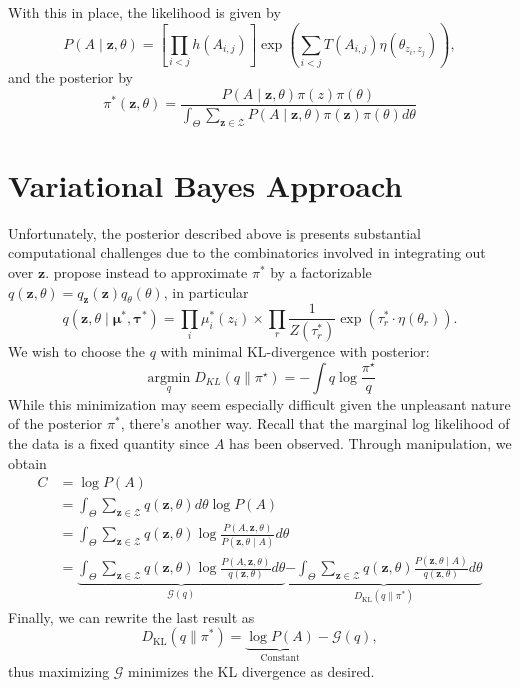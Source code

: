 \documentclass[11pt]{article}   %
\newcommand{\V}[1]{\ensuremath{\boldsymbol{#1}}}
\newcommand{\M}[1]{\ensuremath{#1}}
\begin{document}
With this in place, the likelihood is given by
\begin{equation*}
  P(A \mid \V{z}, \theta) = \left[ \prod_{i < j}  h(A_{i,j}) \right] \exp( \sum_{i < j} T(A_{i,j}) \eta(\theta_{z_i,z_j}) ),
\end{equation*}
and the posterior by
\begin{equation*}
  \pi^{*}(\V{z},\M{\theta}) = \frac{P(\M{A} \mid \V{z},\M{\theta}) \pi(z) \pi(\theta)}{\int_{\Theta} \sum_{\V{z} \in \mathcal{Z}} P(\M{A} \mid \V{z}, \M{\theta}) \pi(\V{z}) \pi(\M{\theta}) d \theta}
\end{equation*}



\section{Variational Bayes Approach}
\label{sec:vari-bayes-appr}
Unfortunately, the posterior described above is presents substantial computational challenges due to the combinatorics involved in integrating out over $\V{z}$.
\textcite*{aicher_adapting_2013,aicher_learning_2015} propose instead to approximate $\pi^{*}$ by a factorizable $q(\V{z},\M{\theta}) = q_{\V{z}}(\V{z}) q_{\M{\theta}}(\M{\theta})$, in particular
\begin{equation*}
  q(\V{z}, \theta \mid \V{\mu^{*}}, \V{\tau^{*}}) = \prod_i \mu_i^{*}(z_i) \times \prod_r \frac{1}{Z(\tau_r^{*})} \exp( \tau_r^{*} \cdot \eta(\theta_r)).
\end{equation*}
We wish to choose the $q$ with minimal KL-divergence with posterior:
\begin{equation*}
  \operatorname*{argmin}_q D_{KL}(q \parallel \pi^{\star}) = - \int q \log \frac{\pi^{\star}}{q}
\end{equation*}
While this minimization may seem especially difficult given the unpleasant nature of the posterior $\pi^{*}$, there's another way.
Recall that the marginal log likelihood of the data is a fixed quantity since $A$ has been observed.
Through manipulation, we obtain
  \begin{align*}
    C &= \log P(A) \\
    &= \int_{\Theta} \sum_{\V{z} \in \mathcal{Z}} q(\V{z},\theta) d\theta \log P(A) \tag{Multiply by 1}\\
              &= \int_{\Theta} \sum_{\V{z} \in \mathcal{Z}} q(\V{z},\theta) \log \frac{P(A, \V{z}, \M{\theta})}{P(\V{z}, \M{\theta} \mid A)} d\theta \tag{Conditioning tricks}\\
              &= \underbrace{\int_{\Theta} \sum_{\V{z} \in \mathcal{Z}} q(\V{z},\theta) \log \frac{P(A, \V{z}, \M{\theta})}{q(\V{z}, \theta)} d\theta}_{\mathcal{G}(q)}  \underbrace{- \int_{\Theta} \sum_{\V{z} \in \mathcal{Z}} q(\V{z}, \theta) \frac{P(\V{z}, \M{\theta} \mid A)}{q(\V{z}, \theta)} d\theta}_{D_{\text{KL}}(q \parallel \pi^{*})}
  \end{align*}
  Finally, we can rewrite the last result as
  \begin{equation*}
  D_{\text{KL}}(q \parallel \pi^{*}) = \underbrace{\log P(A)}_{\text{Constant}} - \mathcal{G}(q),
\end{equation*}
thus maximizing $\mathcal{G}$ minimizes the KL divergence as desired.
\end{document}
